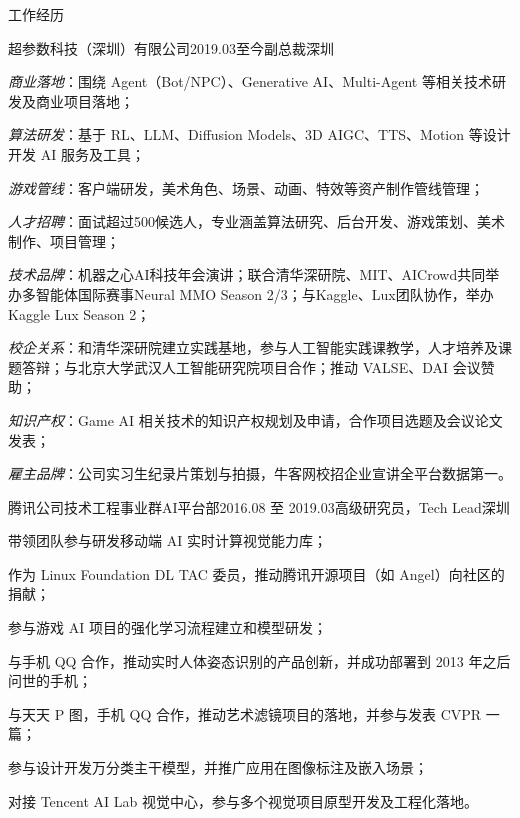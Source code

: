 \documentclass[UTF8]{cv_professional-cn} %
\begin{document}
\begin{rSection}{工作经历}

  \begin{rSubsection}{超参数科技（深圳）有限公司}{2019.03至今}{副总裁}{深圳}
    \item \textit{商业落地}：围绕 Agent（Bot/NPC）、Generative AI、Multi-Agent 等相关技术研发及商业项目落地；
    \item \textit{算法研发}：基于 RL、LLM、Diffusion Models、3D AIGC、TTS、Motion 等设计开发 AI 服务及工具；
    \item \textit{游戏管线}：客户端研发，美术角色、场景、动画、特效等资产制作管线管理；
    \item \textit{人才招聘}：面试超过500候选人，专业涵盖算法研究、后台开发、游戏策划、美术制作、项目管理；
    \item \textit{技术品牌}：机器之心AI科技年会演讲；联合清华深研院、MIT、AICrowd共同举办多智能体国际赛事Neural MMO Season 2/3；与Kaggle、Lux团队协作，举办Kaggle Lux Season 2；
    \item \textit{校企关系}：和清华深研院建立实践基地，参与人工智能实践课教学，人才培养及课题答辩；与北京大学武汉人工智能研究院项目合作；推动 VALSE、DAI 会议赞助；
    \item \textit{知识产权}：Game AI 相关技术的知识产权规划及申请，合作项目选题及会议论文发表；
    \item \textit{雇主品牌}：公司实习生纪录片策划与拍摄，牛客网校招企业宣讲全平台数据第一。
  \end{rSubsection}

  \begin{rSubsection}{腾讯公司技术工程事业群AI平台部}{2016.08 至 2019.03}{高级研究员，Tech Lead}{深圳}
    \item 带领团队参与研发移动端 AI 实时计算视觉能力库；
    \item 作为 Linux Foundation DL TAC 委员，推动腾讯开源项目（如 Angel）向社区的捐献；
    \item 参与游戏 AI 项目的强化学习流程建立和模型研发；
    \item 与手机 QQ 合作，推动实时人体姿态识别的产品创新，并成功部署到 2013 年之后问世的手机；
    \item 与天天 P 图，手机 QQ 合作，推动艺术滤镜项目的落地，并参与发表 CVPR 一篇；
    \item 参与设计开发万分类主干模型，并推广应用在图像标注及嵌入场景；
    \item 对接 Tencent AI Lab 视觉中心，参与多个视觉项目原型开发及工程化落地。
  \end{rSubsection}


\end{rSection}
\end{document}
